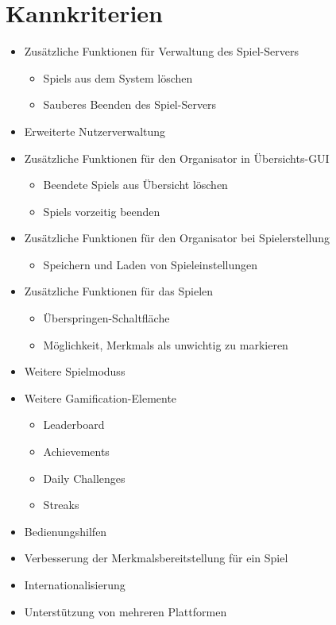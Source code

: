 \documentclass[a4paper]{scrreprt}
\begin{document}
    \section{Kannkriterien}
    \begin{itemize} %
    	\item Zusätzliche Funktionen für Verwaltung des \Gls{Spiel-Server}s
   	\begin{itemize}
            \item \Glspl{Spiel} aus dem System löschen
            \item Sauberes Beenden des \Gls{Spiel-Server}s
        \end{itemize}
	\item Erweiterte Nutzerverwaltung
	\item Zusätzliche Funktionen für den \Gls{Organisator} in Übersichts-GUI
        \begin{itemize}
            \item Beendete \Glspl{Spiel} aus Übersicht löschen
            \item \Glspl{Spiel} vorzeitig beenden
        \end{itemize}
	\item Zusätzliche Funktionen für den \Gls{Organisator} bei Spielerstellung
        \begin{itemize}
            \item Speichern und Laden von \Gls{Spieleinstellungen}
        \end{itemize}
        \item Zusätzliche Funktionen für das Spielen 
        \begin{itemize}
            \item Überspringen-Schaltfläche 
            \item Möglichkeit, \Glspl{Merkmal} als unwichtig zu markieren 
        \end{itemize}
	\item Weitere \Glspl{Spielmodus}
	\item Weitere Gamification-Elemente
        \begin{itemize}
            \item Leaderboard %
            \item \Glspl{Achievement}
            \item Daily Challenges %
            \item Streaks %
        \end{itemize}
        \item Bedienungshilfen 
        \item Verbesserung der Merkmalsbereitstellung für ein \Gls{Spiel}
        \item Internationalisierung 
        \item Unterstützung von mehreren Plattformen
    \end{itemize}
\end{document}
